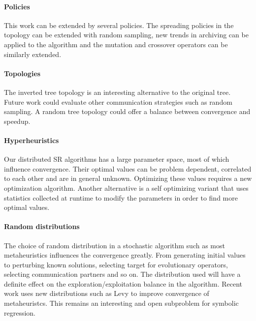 \paragraph{Policies}
This work can be extended by several policies. The spreading policies in the topology can be extended with random sampling, new trends in archiving can be applied to the algorithm and the mutation and crossover operators can be similarly extended. 

\paragraph{Topologies}
The inverted tree topology is an interesting alternative to the original tree. Future work could evaluate other communication strategies such as random sampling. A random tree topology could offer a balance between convergence and speedup.

\paragraph{Hyperheuristics}
Our distributed SR algorithms has a large parameter space, most of which influence convergence. Their optimal values can be problem dependent, correlated to each other and are in general unknown. Optimizing these values requires a new optimization algorithm. Another alternative is a self optimizing variant that uses statistics collected at runtime to modify the parameters in order to find more optimal values.

\paragraph{Random distributions}
The choice of random distribution in a stochastic algorithm such as most metaheuristics influences the convergence greatly. From generating initial values to perturbing known solutions, selecting target for evolutionary operators, selecting communication partners and so on. The distribution used will have a definite effect on the exploration/exploitation balance in the algorithm. Recent work uses new distributions such as Levy \citep{ABCLevy} to improve convergence of metaheuristcs. This remains an interesting and open subproblem for symbolic regression. 
